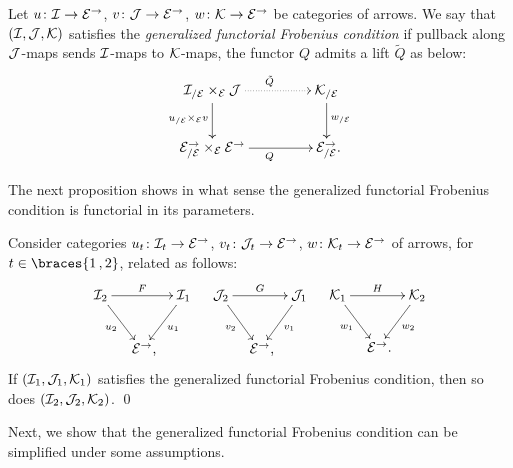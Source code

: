 \documentclass[reqno,10pt,a4paper,oneside,draft]{amsart}
\begin{document}
{{\begin{definition} \label{generalized-uniform-frob}
Let $u \co \cal{I} \to \cal{E}^\to$, $v \co \cal{J} \to \cal{E}^\to$, $w \co \cal{K} \to \catE^\to$ be categories of arrows.
We say that $(\cal{I}, \cal{J}, \cal{K})$ satisfies the \emph{generalized functorial Frobenius condition} if pullback along $\cal{J}$-maps sends $\cal{I}$-maps to $\cal{K}$-maps, \ie the functor $Q$ admits a lift $\tilde{Q}$ as below:
\begin{equation} \label{generalized-uniform-frob:lift}
\begin{gathered}
\xymatrix@C+2em{
  \cal{I}_{/\cal{E}} \times_{\cal{E}} \cal{J}
  \ar@{.>}[r]^{\tilde{Q}}
  \ar[d]_{u_{/\cal{E}} \times_{\cal{E}} v}
&
  \cal{K}_{/\cal{E}}
  \ar[d]^{w_{/\cal{E}}}
\\
  \cal{E}^\to_{/\cal{E}} \times_{\cal{E}} \cal{E}^\to
  \ar[r]_{Q}
&
  \cal{E}_{/\cal{E}}^\to
\rlap{.}}
\end{gathered}
\end{equation}
\end{definition}

The next proposition shows in what sense the generalized functorial Frobenius condition is functorial in its parameters.

\begin{proposition} \label{generalized-uniform-frob-functorial}
Consider categories $u_t \co \cal{I}_t \to \cal{E}^\to$, $v_t \co \cal{J}_t \to \cal{E}^\to$, $w \co \cal{K}_t \to \cal{E}^\to$ of arrows, for $t \in \braces{1\,, 2}$, related as follows:
\begin{align*}
\xymatrix@!C@C-1.5em{
  \cal{I}_2
  \ar[rr]^{F}
  \ar[dr]_{u_2}
&&
  \cal{I}_1
  \ar[dl]^{u_1}
\\&
  \catE^\to
\rlap{,}}
&&
\xymatrix@C-1.5em{
  \cal{J}_2
  \ar[rr]^-{G}
  \ar[dr]_{v_2}
&&
  \cal{J}_1
  \ar[dl]^{v_1}
\\&
  \catE^\to
\rlap{,}}
&&
\xymatrix@C-1.5em{
  \cal{K}_1
  \ar[rr]^-{H}
  \ar[dr]_{w_1}
&&
  \cal{K}_2
  \ar[dl]^{w_2}
\\&
  \catE^\to
\rlap{.}}
\end{align*}
If $(\cal{I}_1, \cal{J}_1, \cal{K}_1)$ satisfies the generalized functorial Frobenius condition, then so does $(\cal{I}_2, \cal{J}_2, \cal{K}_2)$.
\qed
\end{proposition}

Next, we show that the generalized functorial Frobenius condition can be simplified under some assumptions.

}}
\end{document}
